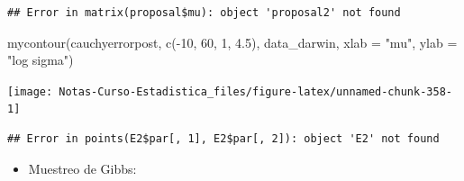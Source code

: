 \documentclass[
  12pt,
]{book}
\newenvironment{Shaded}{\begin{snugshade}}{\end{snugshade}}
\newcommand{\AttributeTok}[1]{\textcolor[rgb]{0.77,0.63,0.00}{#1}}
\newcommand{\DecValTok}[1]{\textcolor[rgb]{0.00,0.00,0.81}{#1}}
\newcommand{\FloatTok}[1]{\textcolor[rgb]{0.00,0.00,0.81}{#1}}
\newcommand{\FunctionTok}[1]{\textcolor[rgb]{0.00,0.00,0.00}{#1}}
\newcommand{\NormalTok}[1]{#1}
\newcommand{\OtherTok}[1]{\textcolor[rgb]{0.56,0.35,0.01}{#1}}
\newcommand{\SpecialCharTok}[1]{\textcolor[rgb]{0.00,0.00,0.00}{#1}}
\newcommand{\StringTok}[1]{\textcolor[rgb]{0.31,0.60,0.02}{#1}}
\providecommand{\tightlist}{%
  \setlength{\itemsep}{0pt}\setlength{\parskip}{0pt}}
\theoremstyle{definition}
\theoremstyle{definition}
\theoremstyle{definition}
\theoremstyle{definition}
\theoremstyle{remark}
\begin{document}
\begin{verbatim}
## Error in matrix(proposal$mu): object 'proposal2' not found
\end{verbatim}

\begin{Shaded}
\begin{Highlighting}[]
\FunctionTok{mycontour}\NormalTok{(cauchyerrorpost, }\FunctionTok{c}\NormalTok{(}\SpecialCharTok{{-}}\DecValTok{10}\NormalTok{, }\DecValTok{60}\NormalTok{, }\DecValTok{1}\NormalTok{, }\FloatTok{4.5}\NormalTok{), data\_darwin,}
    \AttributeTok{xlab =} \StringTok{"mu"}\NormalTok{, }\AttributeTok{ylab =} \StringTok{"log sigma"}\NormalTok{)}
\end{Highlighting}
\end{Shaded}

\begin{center}\texttt{[image: Notas-Curso-Estadistica\_files/figure-latex/unnamed-chunk-358-1]} \end{center}

\begin{Shaded}
\end{Shaded}

\begin{verbatim}
## Error in points(E2$par[, 1], E2$par[, 2]): object 'E2' not found
\end{verbatim}

\begin{itemize}
\tightlist
\item
  Muestreo de Gibbs:
\end{itemize}

\begin{Shaded}
\end{Shaded}
\end{document}
